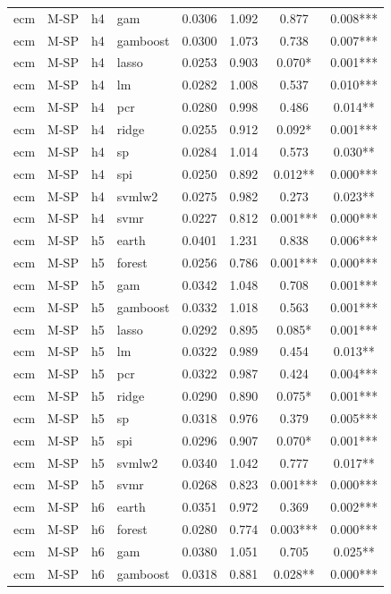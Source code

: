 \begin{ThreePartTable}
\begin{longtable}[t]{llclcccc}
ecm & M-SP & h4 & gam & 0.0306 & 1.092 & 0.877 & 0.008***\\
ecm & M-SP & h4 & gamboost & 0.0300 & 1.073 & 0.738 & 0.007***\\
ecm & M-SP & h4 & lasso & 0.0253 & 0.903 & 0.070* & 0.001***\\
ecm & M-SP & h4 & lm & 0.0282 & 1.008 & 0.537 & 0.010***\\
ecm & M-SP & h4 & pcr & 0.0280 & 0.998 & 0.486 & 0.014**\\
ecm & M-SP & h4 & ridge & 0.0255 & 0.912 & 0.092* & 0.001***\\
ecm & M-SP & h4 & sp & 0.0284 & 1.014 & 0.573 & 0.030**\\
ecm & M-SP & h4 & spi & 0.0250 & 0.892 & 0.012** & 0.000***\\
ecm & M-SP & h4 & svmlw2 & 0.0275 & 0.982 & 0.273 & 0.023**\\
ecm & M-SP & h4 & svmr & 0.0227 & 0.812 & 0.001*** & 0.000***\\
\addlinespace
ecm & M-SP & h5 & earth & 0.0401 & 1.231 & 0.838 & 0.006***\\
ecm & M-SP & h5 & forest & 0.0256 & 0.786 & 0.001*** & 0.000***\\
ecm & M-SP & h5 & gam & 0.0342 & 1.048 & 0.708 & 0.001***\\
ecm & M-SP & h5 & gamboost & 0.0332 & 1.018 & 0.563 & 0.001***\\
ecm & M-SP & h5 & lasso & 0.0292 & 0.895 & 0.085* & 0.001***\\
ecm & M-SP & h5 & lm & 0.0322 & 0.989 & 0.454 & 0.013**\\
ecm & M-SP & h5 & pcr & 0.0322 & 0.987 & 0.424 & 0.004***\\
ecm & M-SP & h5 & ridge & 0.0290 & 0.890 & 0.075* & 0.001***\\
ecm & M-SP & h5 & sp & 0.0318 & 0.976 & 0.379 & 0.005***\\
ecm & M-SP & h5 & spi & 0.0296 & 0.907 & 0.070* & 0.001***\\
ecm & M-SP & h5 & svmlw2 & 0.0340 & 1.042 & 0.777 & 0.017**\\
ecm & M-SP & h5 & svmr & 0.0268 & 0.823 & 0.001*** & 0.000***\\
\addlinespace
ecm & M-SP & h6 & earth & 0.0351 & 0.972 & 0.369 & 0.002***\\
ecm & M-SP & h6 & forest & 0.0280 & 0.774 & 0.003*** & 0.000***\\
ecm & M-SP & h6 & gam & 0.0380 & 1.051 & 0.705 & 0.025**\\
ecm & M-SP & h6 & gamboost & 0.0318 & 0.881 & 0.028** & 0.000***\\

\end{longtable}
\end{ThreePartTable}
